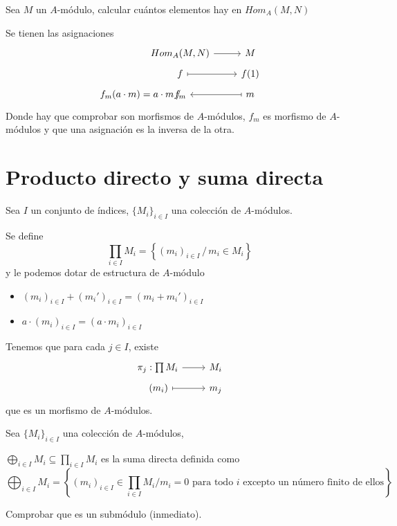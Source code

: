 \begin{ejer}
Sea $M$ un $A$-m\'odulo, calcular cu\'antos elementos hay en $Hom_A(M,N)$
\end{ejer}
\begin{sol}
    Se tienen las asignaciones
    $$\bt 
    &[-23mm] Hom_A(M,N) \arrow{r} & M \\[-5mm]
    &[-23mm] f \arrow[mapsto]{r} & f(1) \\[-5mm]
    f_m(a\cdot m) = a\cdot m \: / \, &[-23mm] f_m & \arrow[mapsto]{l} m
    \et$$
    Donde hay que comprobar son morfismos de $A$-m\'odulos, $f_m$ es morfismo de $A$-m\'odulos y que una asignaci\'on es la inversa de la otra.
\end{sol}
\section{Producto directo y suma directa}
Sea $I$ un conjunto de \'indices, $\{M_i\}_{i \in I}$ una colecci\'on de $A$-m\'odulos.
\begin{defi}
    Se define 
    $$\prod_{i \in I} M_i = \left\{(m_i)_{i \in I} \, / \, m_i \in M_i \right\}$$
    y le podemos dotar de estructura de $A$-m\'odulo  \vspace{-3mm}
    \begin{itemize}
        \item $(m_i)_{i \in I} + (m_i')_{i \in I} = (m_i+m_i')_{i \in I}$
        \item $a\cdot (m_i)_{i \in I} = (a\cdot m_i)_{i \in I}$
    \end{itemize}
    
    Tenemos que para cada $j \in I$, existe
    $$\bt 
    \pi_j : \prod M_i \arrow{r} & M_i \\[-5mm] 
    \, (m_i) \arrow[mapsto]{r} & m_j
    \et$$
    que es un morfismo de $A$-m\'odulos.
\end{defi}

Sea $\{M_i\}_{i \in I}$ una colecci\'on de $A$-m\'odulos, 
\begin{defi}
    $\displaystyle \bigoplus _{i \in I} M_i \subseteq \prod_{i \in I} M_i$ es la suma directa definida como
    $$\bigoplus _{i \in I} M_i = \left\{ (m_i)_{i \in I} \in \prod_{i \in I} M_i / m_i = 0 \text{ para todo } i \text{ excepto un número finito de ellos} \right\}$$
\end{defi}
\begin{ejer}
    Comprobar que es un subm\'odulo (inmediato).
\end{ejer}

